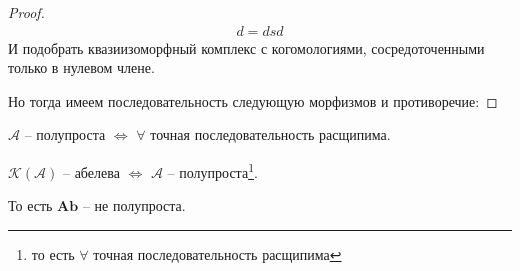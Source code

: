 \begin{to_ex}
\begin{proof}
\begin{align*}
    d = dsd
\end{align*}
И подобрать квазиизоморфный комплекс с когомологиями, сосредоточенными только в нулевом члене.
\bee
{}
\eee
Но тогда имеем последовательность следующую морфизмов и противоречие:
\bee
{}
\eee
\end{proof}
\end{to_ex}
\begin{to_def}
$\mathcal{A}$ -- полупроста $\Leftrightarrow$ $\forall$ точная последовательность расщипима.
\end{to_def}
\begin{to_claim}
$\mathcal{K(A)}$ -- абелева $\Leftrightarrow$ $\mathcal{A}$ -- полупроста\footnote{то есть $\forall$ точная последовательность расщипима}.
\end{to_claim}
\begin{to_ex}
\bee
{}
\eee
То есть $\mathbf{Ab}$ -- не полупроста.
\end{to_ex}